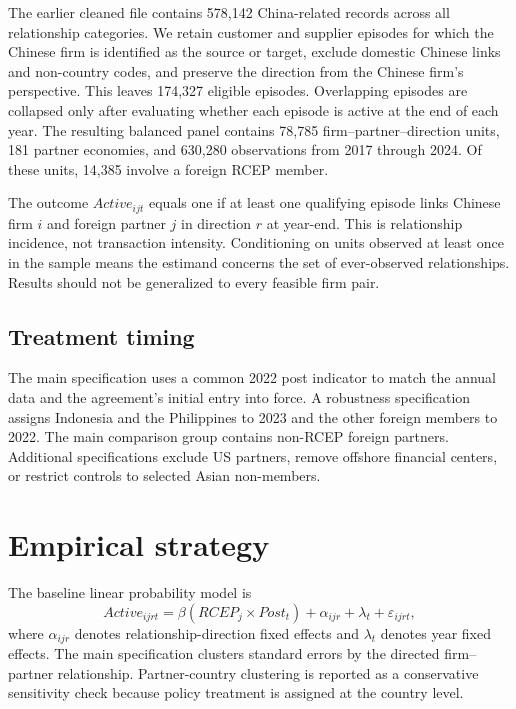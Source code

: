 \documentclass[preprint,12pt,authoryear]{elsarticle}
\begin{document}
The earlier cleaned file contains 578,142 China-related records across all relationship categories. We retain customer and supplier episodes for which the Chinese firm is identified as the source or target, exclude domestic Chinese links and non-country codes, and preserve the direction from the Chinese firm's perspective. This leaves 174,327 eligible episodes. Overlapping episodes are collapsed only after evaluating whether each episode is active at the end of each year. The resulting balanced panel contains 78,785 firm--partner--direction units, 181 partner economies, and 630,280 observations from 2017 through 2024. Of these units, 14,385 involve a foreign RCEP member.

The outcome $Active_{ijt}$ equals one if at least one qualifying episode links Chinese firm $i$ and foreign partner $j$ in direction $r$ at year-end. This is relationship incidence, not transaction intensity. Conditioning on units observed at least once in the sample means the estimand concerns the set of ever-observed relationships. Results should not be generalized to every feasible firm pair.

\subsection{Treatment timing}

The main specification uses a common 2022 post indicator to match the annual data and the agreement's initial entry into force. A robustness specification assigns Indonesia and the Philippines to 2023 and the other foreign members to 2022. The main comparison group contains non-RCEP foreign partners. Additional specifications exclude US partners, remove offshore financial centers, or restrict controls to selected Asian non-members.

\section{Empirical strategy}

The baseline linear probability model is
\begin{equation}
Active_{ijrt}=\beta(RCEP_j\times Post_t)+\alpha_{ijr}+\lambda_t+\varepsilon_{ijrt},
\end{equation}
where $\alpha_{ijr}$ denotes relationship-direction fixed effects and $\lambda_t$ denotes year fixed effects. The main specification clusters standard errors by the directed firm--partner relationship. Partner-country clustering is reported as a conservative sensitivity check because policy treatment is assigned at the country level.
\end{document}

